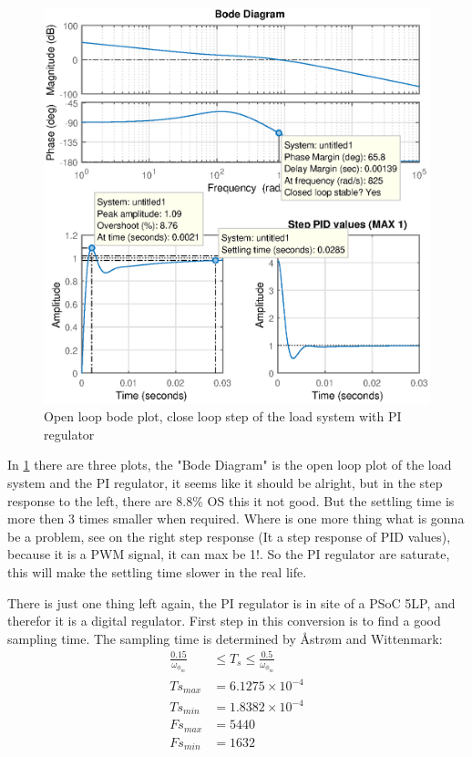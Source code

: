 \begin{figure}[H]
	\centering
	\includegraphics [width=6in]{Hardware/Pictures/RolingRoad_PI_result.eps}
	\caption{Open loop bode plot, close loop step of the load system with PI regulator}
	\label{fig:Open_loop_bode_close_loop_step_load_system}
\end{figure}

In \ref{fig:Open_loop_bode_close_loop_step_load_system} there are three plots, the "Bode Diagram" is the open loop plot of the load system and the PI regulator, it seems like it should be alright, but in the step response to the left, there are $ 8.8 \% $ OS this it not good. But the settling time is more then 3 times smaller when required. Where is one more thing what is gonna be a problem, see on the right step response (It a step response of PID values), because it is a PWM signal, it can max be 1!. So the PI regulator are saturate, this will make the settling time slower in the real life. 

There is just one thing left again, the PI regulator is in site of a PSoC 5LP, and therefor it is a digital regulator. First step in this conversion is to find a good sampling time. The sampling time is determined by Åstrøm and Wittenmark:
\begin{equation}
\begin{split}
	\frac{0.15}{\omega _{\phi _{m}}} &\leq T_{s} \leq \frac{0.5}{\omega _{\phi _{m}}}\\
	Ts_{max} &= 6.1275 \times 10^{-4}\\
	Ts_{min} &= 1.8382 \times 10^{-4}\\
	Fs_{max} &= 5440\\
	Fs_{min} &= 1632
\end{split}
\end{equation}

